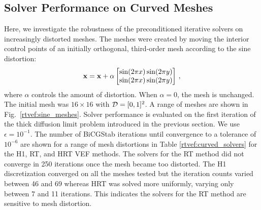 \documentclass[../doc.tex]{subfiles}
\begin{document}
\subsection{Solver Performance on Curved Meshes}
Here, we investigate the robustness of the preconditioned iterative solvers on increasingly distorted meshes. The meshes were created by moving the interior control points of an initially orthogonal, third-order mesh according to the sine distortion: 
	\begin{equation}
		\boldsymbol{\mathrm{x}} = \boldsymbol{\mathrm{x}} + \alpha\begin{bmatrix} 
			\sin(2\pi x) \sin(2\pi y)\\
			\sin(2\pi x) \sin(2\pi y)
		\end{bmatrix} \,,
	\end{equation}
where $\alpha$ controls the amount of distortion. When $\alpha=0$, the mesh is unchanged. The initial mesh was $16\times 16$ with $\mathcal{D} = [0,1]^2$. A range of meshes are shown in Fig.~\ref{rtvef:sine_meshes}. Solver performance is evaluated on the first iteration of the thick diffusion limit problem introduced in the previous section. We use $\epsilon = 10^{-1}$. The number of BiCGStab iterations until convergence to a tolerance of $10^{-6}$ are shown for a range of mesh distortions in Table \ref{rtvef:curved_solvers} for the H1, RT, and HRT VEF methods. The solvers for the RT method did not converge in 250 iterations once the mesh became too distorted. The H1 discretization converged on all the meshes tested but the iteration counts varied between 46 and 69 whereas HRT was solved more uniformly, varying only between 7 and 11 iterations. This indicates the solvers for the RT method are sensitive to mesh distortion. 
\end{document}
